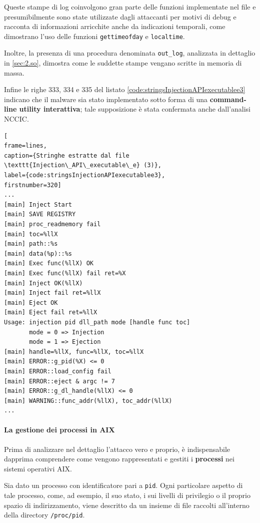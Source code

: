 \documentclass[10pt,a4paper, titlepage]{report}
\begin{document}
Queste stampe di log coinvolgono gran parte delle funzioni implementate nel file e presumibilmente sono state utilizzate dagli attaccanti per motivi di debug e racconta di informazioni arricchite anche da indicazioni temporali, come dimostrano l'uso delle funzioni \texttt{gettimeofday} e \texttt{localtime}. 

Inoltre, la presenza di una procedura denominata \texttt{out\_log}, analizzata in dettaglio in \ref{sec:2.so}, dimostra come le suddette stampe vengano scritte in memoria di massa.

Infine le righe 333, 334 e 335 del listato \ref{code:stringsInjectionAPIexecutablee3} indicano che il malware sia stato implementato sotto forma di una \textbf{command-line utility interattiva}; tale supposizione è stata confermata anche dall'analisi NCCIC. 

\begin{lstlisting}[
frame=lines, 
caption={Stringhe estratte dal file \texttt{Injection\_API\_executable\_e} (3)}, 
label={code:stringsInjectionAPIexecutablee3},
firstnumber=320]
...
[main] Inject Start
[main] SAVE REGISTRY
[main] proc_readmemory fail
[main] toc=%llX
[main] path::%s
[main] data(%p)::%s
[main] Exec func(%llX) OK
[main] Exec func(%llX) fail ret=%X
[main] Inject OK(%llX)
[main] Inject fail ret=%llX
[main] Eject OK
[main] Eject fail ret=%llX
Usage: injection pid dll_path mode [handle func toc]
       mode = 0 => Injection
       mode = 1 => Ejection
[main] handle=%llX, func=%llX, toc=%llX
[main] ERROR::g_pid(%X) <= 0
[main] ERROR::load_config fail
[main] ERROR::eject & argc != 7
[main] ERROR::g_dl_handle(%llX) <= 0
[main] WARNING::func_addr(%llX), toc_addr(%llX)
...
\end{lstlisting}

\paragraph{La gestione dei processi in AIX}

Prima di analizzare nel dettaglio l'attacco vero e proprio, è indispensabile dapprima comprendere come vengono rappresentati e gestiti i \textbf{processi} nei sistemi operativi AIX.

Sia dato un processo con identificatore pari a \texttt{pid}. Ogni particolare aspetto di tale processo, come, ad esempio, il suo stato, i sui livelli di privilegio o il proprio spazio di indirizzamento, viene descritto da un insieme di file raccolti all'interno della directory \texttt{/proc/pid}.
\end{document}
